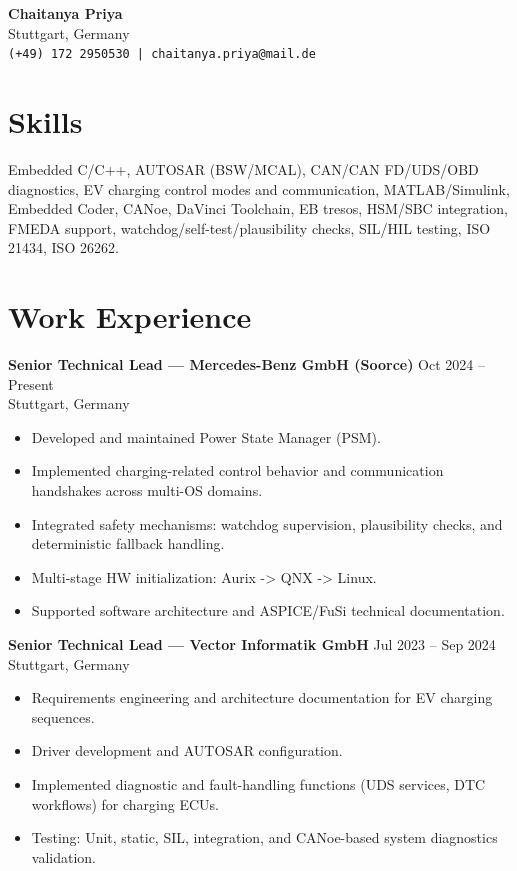 \documentclass[a4paper,10pt]{article}
\begin{document}
\begin{center}
    {\LARGE \textbf{Chaitanya Priya}} \\
    Stuttgart, Germany \\
    \texttt{(+49) 172 2950530 | chaitanya.priya@mail.de} \\
\end{center}

\section*{Skills}
Embedded C/C++, AUTOSAR (BSW/MCAL), CAN/CAN FD/UDS/OBD diagnostics, EV charging control modes and communication, MATLAB/Simulink, Embedded Coder, CANoe, DaVinci Toolchain, EB tresos, HSM/SBC integration, FMEDA support, watchdog/self-test/plausibility checks, SIL/HIL testing, ISO 21434, ISO 26262.

\section*{Work Experience}

\textbf{Senior Technical Lead — Mercedes-Benz GmbH (Soorce)} \hfill Oct 2024 -- Present \\
Stuttgart, Germany
\begin{itemize}
    \item Developed and maintained Power State Manager (PSM).
    \item Implemented charging-related control behavior and communication handshakes across multi-OS domains.
    \item Integrated safety mechanisms: watchdog supervision, plausibility checks, and deterministic fallback handling.
    \item Multi-stage HW initialization: Aurix -> QNX -> Linux.
    \item Supported software architecture and ASPICE/FuSi technical documentation.
\end{itemize}

\textbf{Senior Technical Lead — Vector Informatik GmbH} \hfill Jul 2023 -- Sep 2024 \\
Stuttgart, Germany
\begin{itemize}
    \item Requirements engineering and architecture documentation for EV charging sequences.
    \item Driver development and AUTOSAR configuration.
    \item Implemented diagnostic and fault-handling functions (UDS services, DTC workflows) for charging ECUs.
    \item Testing: Unit, static, SIL, integration, and CANoe-based system diagnostics validation.
\end{itemize}
\end{document}

